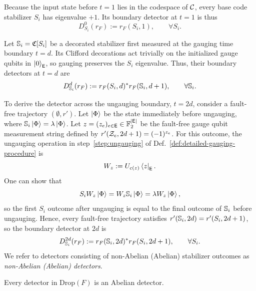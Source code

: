 \documentclass[11pt]{article}
\begin{document}
Because the input state before $t=1$ lies in the codespace of $\mathcal{C}$, every base code stabilizer $S_i$ has eigenvalue $+1$.
Its boundary detector at $t=1$ is thus
\[
D^0_{S_i}(r_F) := r_F(S_i,1),\qquad \forall S_i.
\]

Let $\mathbb{S}_i=\mathfrak{C}[S_i]$ be a decorated stabilizer first measured at the gauging time boundary $t=d$.
Its Clifford decorations act trivially on the initialized gauge qubits in $\ket{0}_{\mathsf{E}}$, so gauging preserves the $S_i$ eigenvalue.
Thus, their boundary detectors at $t=d$ are 
\[
D^{d}_{\mathbb{S}_i}(r_F) := r_F(S_i, d)^* r_F(\mathbb{S}_i, d+1),\qquad \forall \mathbb{S}_i.
\]

To derive the detector across the ungauging boundary, $t=2d$, consider a fault-free trajectory $(\emptyset,r')$. 
Let $\ket{\Phi}$ be the state immediately before ungauging, where $\mathbb{S}_i\ket{\Phi}=\lambda\ket{\Phi}$.
Let $z=(z_e)_{e\in\mathsf{E}}\in \mathbb{F}_2^{|\mathsf{E}|}$ be the fault-free gauge qubit measurement string defined by $r'(\mathcal{Z}_e, 2d+1) = (-1)^{z_e}$. 
For this outcome, the ungauging operation in step~\ref{step:ungauging} of Def.~\ref{def:detailed-gauging-procedure} is 
\[
W_z := U_{c(z)} \bra{z}_{\mathsf{E}}.
\]
One can show that  
\[
S_iW_z\ket{\Phi}= W_z \mathbb{S}_i \ket{\Phi} = \lambda W_z\ket{\Phi},
\]
so the first $S_i$ outcome after ungauging is equal to the final outcome of $\mathbb{S}_i$ before ungauging.
Hence, every fault-free trajectory satisfies $r'(\mathbb{S}_i,2d) = r'(S_i,2d+1)$, so the boundary detector at $2d$ is
\[
D_{\mathbb{S}_i}^{2d}(r_F):=r_F (\mathbb{S}_i,2d)^* r_F(S_i,2d+1),\qquad \forall S_i.
\]
We refer to detectors consisting of non-Abelian (Abelian) stabilizer outcomes as \emph{non-Abelian (Abelian) detectors}.


\begin{lemma}
    \label{lem:abelian-dropped-only}
    Every detector in $\mathrm{Drop}(F)$ is an Abelian detector.
\end{lemma}
\end{document}
